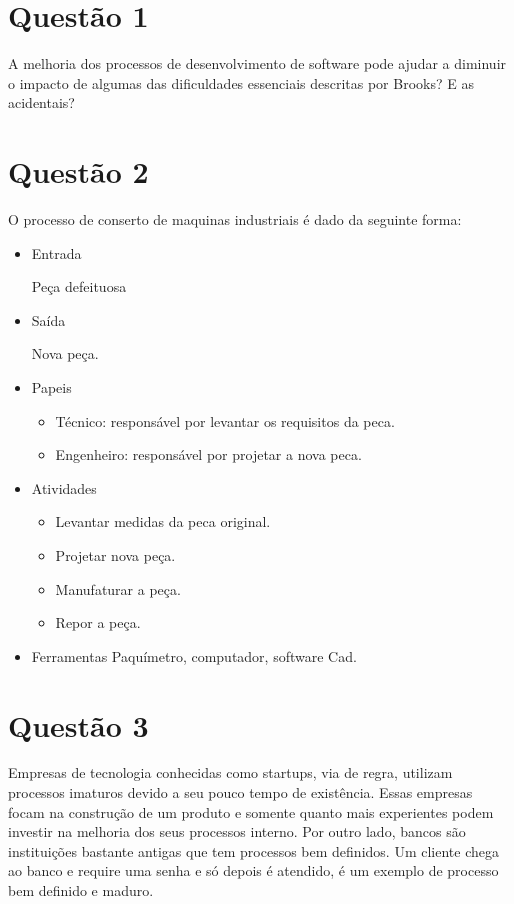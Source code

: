 \section{Questão 1} 
A melhoria dos processos de desenvolvimento de software pode ajudar a diminuir o impacto de algumas das dificuldades essenciais descritas por Brooks? E as acidentais?

\section{Questão 2}

O processo de conserto de maquinas industriais é dado da seguinte forma:
\begin{itemize}
    \item Entrada

        Peça defeituosa

    \item Saída

        Nova peça.

    \item Papeis
        \begin{itemize}
            \item Técnico: responsável por levantar os requisitos da peca.
            \item Engenheiro: responsável por projetar a nova peca.
        \end{itemize}
        
    \item Atividades
       \begin{itemize}
        \item Levantar medidas da peca original.
        \item Projetar nova peça.
        \item Manufaturar a peça.
        \item Repor a peça.
       \end{itemize} 
    \item Ferramentas
       Paquímetro, computador, software Cad.
    
\end{itemize}

\section{Questão 3}
    Empresas de tecnologia conhecidas como startups, via de regra, utilizam
processos imaturos devido a seu pouco tempo de existência. Essas empresas
focam na construção de um produto e somente quanto mais experientes podem
investir na melhoria dos seus processos interno. Por outro lado, bancos
são instituições bastante antigas que tem processos bem definidos. Um cliente
chega ao banco e require uma senha e só depois é atendido, é um exemplo de 
processo bem definido e maduro. 

